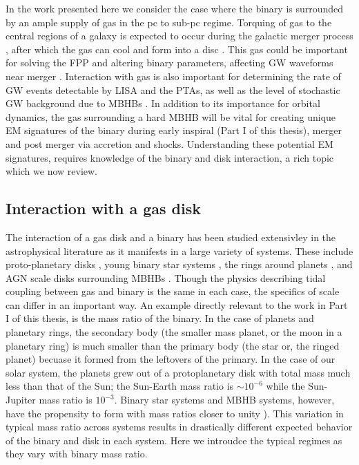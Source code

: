 In the work presented here we consider the case where the binary is surrounded
by an ample supply of gas in the pc to sub-pc regime. Torquing of gas to the
central regions of a galaxy is expected to occur during the galactic merger
process \citep{BH1992, Barnes:1996}, after which the gas can cool and form into
a disc \citep{Barnes:2002}. This gas could be important for solving the FPP
and altering binary parameters, affecting GW waveforms near merger
\citep[\emph{e.g.}][]{ArmNat:2005, YKH:2011:L, RoedigSesana:2012:eccGWs}.
Interaction with gas is also important for determining the rate of GW events
detectable by LISA and the PTAs, as well as the level of stochastic GW
background due to MBHBs \citep{KocsisSesana:2011, Shannon:2015,
Sesana+2016:GWB, EPTA:GWB:2015, Arzoumanian:2015:SGWB}. In addition to its importance for orbital dynamics,
the gas surrounding a hard MBHB will be vital for creating unique EM
signatures of the binary during early inspiral (Part I of this thesis), merger
\citep{Chang:2010, Baruteau:2012, CerioliLodato:Squeeze:2016} and post merger
\citep{Lippai:2008, Lia10, Rossi:2010, Ponce:2012, Rosotti:2012, Zanotti:2012} via accretion and shocks. Understanding these potential EM signatures, requires knowledge of the binary and disk interaction, a rich topic which we now review.




\subsection{Interaction with a gas disk}

The interaction of a gas disk and a binary has been studied extensivley in the
astrophysical literature as it manifests in a large variety of systems. These
include proto-planetary disks \citep[\emph{e.g.}][]{Ward:1997}, young binary
star systems \citep[\emph{e.g.}][]{AL94}, the rings around planets
\citep{GTSaturn78}, and AGN scale disks surrounding MBHBs
\citep[\emph{e.g.}][]{GouldRix:2000}. Though the physics describing tidal
coupling between gas and binary is the same in each case, the specifics of
scale can differ in an important way.  An example directly relevant to the
work in Part I of this thesis, is the mass ratio of the binary. In the case of
planets and planetary rings, the secondary body (the smaller mass planet, or
the moon in a planetary ring) is much smaller than the primary body (the star
or, the ringed planet) becuase it formed from the leftovers of the primary. In
the case of our solar system, the planets grew out of a protoplanetary disk
with total mass much less than that of the Sun; the Sun-Earth mass
ratio is $\sim10^{-6}$ while the Sun-Jupiter mass ratio is $10^{-3}$. Binary
star systems and MBHB systems, however, have the propensity to form with mass
ratios closer to unity \citep[for MBHBs see previous section, for stars see][]{StellMassRatDist:2015}). This variation in typical mass ratio across
systems results in drastically different expected behavior of the binary and
disk in each system. Here we introudce the typical regimes as they vary with
binary mass ratio.

